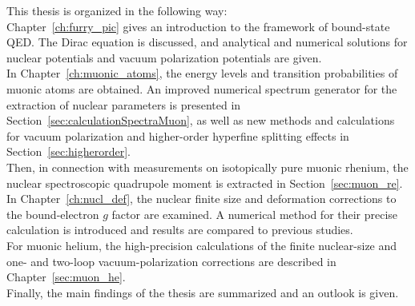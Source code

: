 This thesis is organized in the following way:\\
Chapter~\ref{ch:furry_pic} gives an introduction to the framework of bound-state QED. 
The Dirac equation is discussed, and analytical and numerical solutions for nuclear potentials and vacuum polarization potentials are given.\\
In Chapter~\ref{ch:muonic_atoms}, the energy levels and transition probabilities of muonic atoms are obtained. An improved numerical spectrum generator for the extraction of nuclear parameters is presented in Section~\ref{sec:calculationSpectraMuon}, as well as new methods and calculations for vacuum polarization and higher-order hyperfine splitting effects in Section~\ref{sec:higherorder}. \\
Then, in connection with measurements on isotopically pure muonic rhenium, the nuclear spectroscopic quadrupole moment is extracted in Section~\ref{sec:muon_re}.\\
In Chapter~\ref{ch:nucl_def}, the nuclear finite size and deformation corrections to the bound-electron $g$ factor are examined. A numerical method for their precise calculation is introduced and results are compared to previous studies.\\
For muonic helium, the high-precision calculations of the finite nuclear-size and one- and two-loop vacuum-polarization corrections are described in Chapter~\ref{sec:muon_he}.\\
Finally, the main findings of the thesis are summarized and an outlook is given.




































